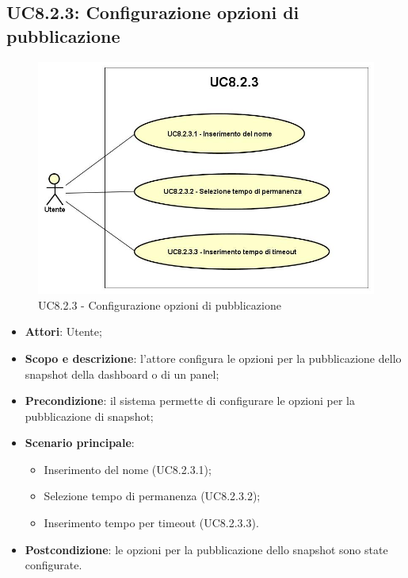 \subsection{UC8.2.3: Configurazione opzioni di pubblicazione}
\hypertarget{UC8.2.3}{}
\begin{figure} [H]
	\centering
	\includegraphics[scale=0.45]{Img/UC8-2-3}
	\caption{UC8.2.3 - Configurazione opzioni di pubblicazione}\label{}
\end{figure}
\begin{itemize}
	\item \textbf{Attori}: Utente;
	\item \textbf{Scopo e descrizione}: l'attore configura le opzioni per la pubblicazione dello snapshot della dashboard o di un panel;
	\item \textbf{Precondizione}: il sistema permette di configurare le opzioni per la pubblicazione di snapshot;
	\item \textbf{Scenario principale}:
	\begin{itemize}
		\item Inserimento del nome (UC8.2.3.1);
		\item Selezione tempo di permanenza (UC8.2.3.2);
		\item Inserimento tempo per timeout (UC8.2.3.3).
	\end{itemize}
	\item \textbf{Postcondizione}: le opzioni per la pubblicazione dello snapshot sono state configurate.
\end{itemize}

